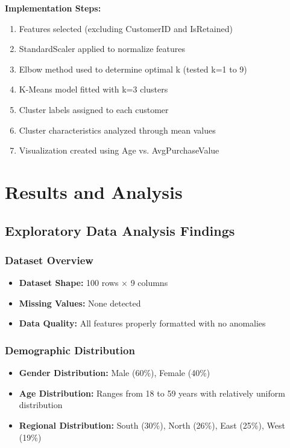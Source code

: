 \documentclass[12pt,a4paper]{article}
\begin{document}
\textbf{Implementation Steps:}
\begin{enumerate}
    \item Features selected (excluding CustomerID and IsRetained)
    \item StandardScaler applied to normalize features
    \item Elbow method used to determine optimal k (tested k=1 to 9)
    \item K-Means model fitted with k=3 clusters
    \item Cluster labels assigned to each customer
    \item Cluster characteristics analyzed through mean values
    \item Visualization created using Age vs. AvgPurchaseValue
\end{enumerate}

\section{Results and Analysis}

\subsection{Exploratory Data Analysis Findings}

\subsubsection{Dataset Overview}
\begin{itemize}
    \item \textbf{Dataset Shape:} 100 rows × 9 columns
    \item \textbf{Missing Values:} None detected
    \item \textbf{Data Quality:} All features properly formatted with no anomalies
\end{itemize}

\subsubsection{Demographic Distribution}
\begin{itemize}
    \item \textbf{Gender Distribution:} Male (60\%), Female (40\%)
    \item \textbf{Age Distribution:} Ranges from 18 to 59 years with relatively uniform distribution
    \item \textbf{Regional Distribution:} South (30\%), North (26\%), East (25\%), West (19\%)
\end{itemize}
\end{document}
